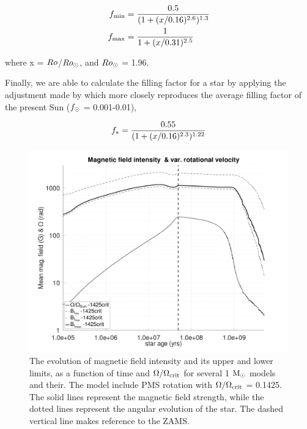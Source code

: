 \documentclass[fleqn,usenatbib]{mnras}
\begin{document}
\begin{ceqn}
\begin{align}
     f_{\mathrm{min}} &= \frac{0.5}{(1+(x/0.16)^{2.6})^{1.3}} \label{eq:fmin}\\
     f_{\mathrm{max}} &= \frac{1}{1+(x/0.31)^{2.5}} \label{eq:fmax}
\end{align}
\end{ceqn}
where x = $Ro$/$Ro_\odot$, and $Ro_\odot$ = 1.96.


Finally, we are able to calculate the filling factor for a star by applying the adjustment made by \cite{Gallet2013} which more closely reproduces the average filling factor of the present Sun ($f_{\mathrm{\odot}}$ = 0.001-0.01),
\begin{ceqn}
\begin{equation}
     f_{\mathrm{*}} = \frac{0.55}{(1+(x/0.16)^{2.3})^{1.22}} \label{eq:fstart}
\end{equation}
\end{ceqn}

\begin{figure}
	\includegraphics[clip,width=\columnwidth]{figures/paper2/mag_field_limits_var_vel_g3.pdf}
    \caption{The evolution of magnetic field intensity and its upper and lower limits, as a function of time and $\Omega / \Omega_{\mathrm{crit}}$ for several 1 $\mathrm{M}_\odot$ models and their. The model include PMS rotation with $\Omega / \Omega_{\mathrm{crit}}$ = 0.1425. The solid lines represent the magnetic field strength, while the dotted lines represent the angular evolution of the star. The dashed vertical line makes reference to the ZAMS.}
    \label{fig:mag_field_limits_var_vel_g3}
\end{figure}
\end{document}
